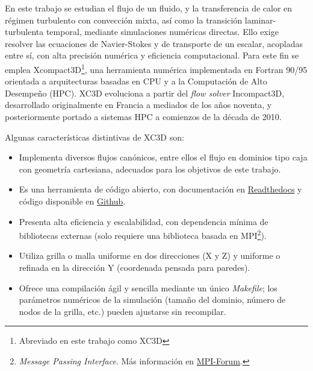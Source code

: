 En este trabajo se estudian el flujo de un fluido, y la transferencia de calor en régimen turbulento con convección mixta, así como la transición laminar-turbulenta temporal, mediante simulaciones numéricas directas. Ello exige resolver las ecuaciones de Navier-Stokes y de transporte de un escalar, acopladas entre sí, con alta precisión numérica y eficiencia computacional. Para este fin se emplea Xcompact3D\footnote{Abreviado en este trabajo como XC3D}, una herramienta numérica implementada en Fortran 90/95 orientada a arquitecturas basadas en CPU y a la Computación de Alto Desempeño (HPC). XC3D evoluciona a partir del \textit{flow solver} Incompact3D, desarrollado originalmente en Francia a mediados de los años noventa, y posteriormente portado a sistemas HPC a comienzos de la década de 2010.

Algunas características distintivas de XC3D son:
\begin{itemize}
\item Implementa diversos flujos canónicos, entre ellos el flujo en dominios tipo caja con geometría cartesiana, adecuados para los objetivos de este trabajo.
\item Es una herramienta de código abierto, con documentación en \href{https://xcompact3d.readthedocs.io/en/latest/}{Readthedocs} y código disponible en \href{https://github.com/xcompact3d}{Github}.
\item Presenta alta eficiencia y escalabilidad, con dependencia mínima de bibliotecas externas (solo requiere una biblioteca basada en MPI\footnote{\textit{Message Passing Interface}. Más información en \href{https://www.mpi-forum.org/}{MPI-Forum}.}).
\item Utiliza grilla o malla uniforme en dos direcciones (X y Z) y uniforme o refinada en la dirección Y (coordenada
pensada para paredes).
\item Ofrece una compilación ágil y sencilla mediante un único \textit{Makefile}; los parámetros numéricos de la simulación (tamaño del dominio, número de nodos de la grilla, etc.) pueden ajustarse sin recompilar.
\end{itemize}


